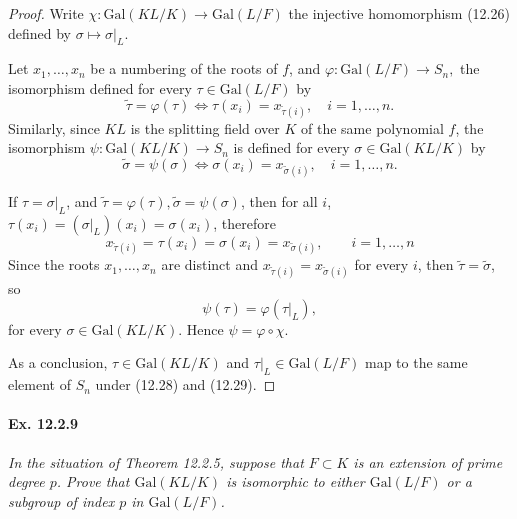 \documentclass[11pt,a4paper]{article}
\newcommand{\Gal}{\mathrm{Gal}}
\begin{document}
\begin{proof}
Write $\chi : \Gal(KL/K) \to \Gal(L/F)$ the injective homomorphism (12.26) defined by $\sigma  \mapsto \sigma\vert_L$.


Let $x_1,\ldots,x_n$ be a numbering of the roots of $f$, and 
$\varphi : \Gal(L/F) \to S_n,$ the isomorphism defined for every  $\tau \in \Gal(L/F)$ by 
$$\tilde{\tau} = \varphi(\tau) \iff \tau(x_i) = x_{\tilde{\tau}(i)}, \quad i=1,\ldots,n.$$
Similarly, since $KL$ is the splitting field over $K$ of the same polynomial $f$, the isomorphism $\psi : \Gal(KL/K) \to S_n$ is defined for every $\sigma \in \Gal(KL/K)$ by
$$\tilde{\sigma} = \psi(\sigma) \iff \sigma(x_i) = x_{\tilde{\sigma}(i)}, \quad i=1,\ldots,n.$$

If $\tau = \sigma|_L$, and $\tilde{\tau} = \varphi(\tau), \tilde{\sigma}= \psi(\sigma)$, then for all $i$, $\tau(x_i) =(\sigma|_L)(x_i) = \sigma(x_i)$, therefore
$$x_{\tilde{\tau}(i)} = \tau(x_i) = \sigma(x_i) = x_{\tilde{\sigma}(i)},\qquad i= 1,\ldots,n $$
Since the roots $x_1,\ldots,x_n$ are distinct and $x_{\tilde{\tau}(i)} = x_{\tilde{\sigma}(i)}$ for every $i$, then $\tilde{\tau} = \tilde{\sigma}$, so 
$$\psi(\tau) = \varphi(\tau|_L),$$
for every $\sigma \in \Gal(KL/K)$.  Hence $\psi = \varphi \circ \chi$.

As a conclusion,
$\tau \in \Gal(KL/K)$ and $\tau|_L \in \Gal(L/F)$ map to the same element of $S_n$ under (12.28) and (12.29).
\end{proof}

\paragraph{Ex. 12.2.9}

{\it In the situation of Theorem 12.2.5, suppose that $F\subset K$ is an extension of prime degree $p$. Prove that $\Gal(KL/K)$ is isomorphic to either $\Gal(L/F)$ or a subgroup of index $p$ in $\Gal(L/F)$.
}


\begin{center}


\end{center}
\end{document}
